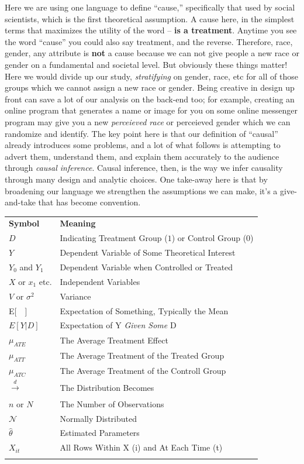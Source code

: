 \documentclass[12pt]{article}\usepackage[]{graphicx}\usepackage[]{color}
\begin{document}
\begin{flushleft}
Here we are using one language to define ``cause,'' specifically that used by social scientists, which is the first theoretical assumption. A cause here, in the simplest terms that maximizes the utility of the word -- \textbf{is a treatment}. Anytime you see the word ``cause'' you could also say treatment, and the reverse. Therefore, race, gender, any attribute is \textbf{not} a cause because we can not give people a new race or gender on a fundamental and societal level. But obviously these things matter! Here we would divide up our study, \textit{stratifying} on gender, race, etc for all of those groups which we cannot assign a new race or gender. Being creative in design up front can save a lot of our analysis on the back-end too; for example, creating an online program that generates a name or image for you on some online messenger program may give you a new \textit{perceieved race} or {perceieved gender} which we can randomize and identify. The key point here is that our definition of ``causal'' already introduces some problems, and a lot of what follows is attempting to advert them, understand them, and explain them accurately to the audience through \textit{causal inference}. Causal inference, then, is the way we infer causality through many design and analytic choices. One take-away here is that by broadening our language we strengthen the assumptions we can make, it's a give-and-take that has become convention. 

\begin{longtable}{ll}
\hline\noalign{\smallskip}
\textbf{Symbol} & \textbf{Meaning} \\
\noalign{\smallskip}\hline\noalign{\smallskip}
$D$ & Indicating Treatment Group ($1$) or Control Group ($0$)\\
$Y$ & Dependent Variable of Some Theoretical Interest        \\
$Y_0$ and $Y_1$ & Dependent Variable when Controlled or Treated\\
$X$ or $x_1$ etc. & Independent Variables\\
$V$ or $\sigma^2$ & Variance\\
E[~~]  & Expectation of Something, Typically the Mean\\
$E[Y |D]$ & Expectation of Y \textit{Given Some} D\\
$\mu_{ATE}$ & The Average Treatment Effect\\
$\mu_{ATT}$ & The Average Treatment of the Treated Group\\
$\mu_{ATC}$ & The Average Treatment of the Controll Group\\
$\xrightarrow[]{d}$ & The Distribution Becomes\\
$n$ or $N$ & The Number of Observations\\
$\mathcal{N}$ & Normally Distributed\\
$\hat{\theta}$ & Estimated Parameters\\
$X_{it}$ & All Rows Within X (i) and At Each Time (t)\\
\noalign{\smallskip}\hline\noalign{\smallskip}
\end{longtable}



\end{flushleft}
\end{document}
